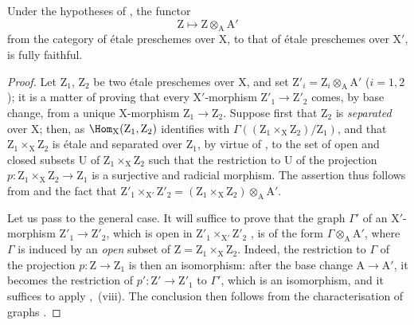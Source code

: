 \begin{corollary}[18.9.5]
\label{IV.18.9.5}
Under the hypotheses of , the functor
\begin{equation}
  \mathrm{Z}\mapsto\mathrm{Z}\otimes_{\mathrm{A}}\mathrm{A}'
  \tag{18.9.5.1}
\end{equation}
from the category of \'{e}tale preschemes over $\mathrm{X}$, to that of \'{e}tale preschemes over $\mathrm{X}'$, is fully faithful.
\end{corollary}

\begin{proof}
Let $\mathrm{Z}_1$, $\mathrm{Z}_2$ be two \'{e}tale preschemes over X, and set $\mathrm{Z}'_i=\mathrm{Z}_i\otimes_{\mathrm{A}}\mathrm{A}'$ ($i=1,2$);
it is a matter of proving that every $\mathrm{X}'$-morphism $\mathrm{Z}'_1\to\mathrm{Z}'_2$ comes, by base change, from a unique X-morphism $\mathrm{Z}_1\to\mathrm{Z}_2$.
Suppose first that $\mathrm{Z}_2$ is \emph{separated} over X;
then, as $\Hom_{\mathrm{X}}(\mathrm{Z}_1,\mathrm{Z}_2)$ identifies with $\Gamma((\mathrm{Z}_1\times_{\mathrm{X}}\mathrm{Z}_2)/\mathrm{Z}_1)$, and that $\mathrm{Z}_1\times_{\mathrm{X}}\mathrm{Z}_2$ is \'{e}tale and separated over $\mathrm{Z}_1$, by virtue of , to the set of open and closed subsets U of $\mathrm{Z}_1\times_{\mathrm{X}}\mathrm{Z}_2$ such that the restriction to U of the projection $p:\mathrm{Z}_1\times_{\mathrm{X}}\mathrm{Z}_2\to\mathrm{Z}_1$ is a surjective and radicial morphism.
The assertion thus follows from  and the fact that $\mathrm{Z}'_1\times_{\mathrm{X}'}\mathrm{Z}'_2=(\mathrm{Z}_1\times_{\mathrm{X}}\mathrm{Z}_2)\otimes_{\mathrm{A}}\mathrm{A}'$.

Let us pass to the general case.
It will suffice to prove that the graph $\Gamma'$ of an $\mathrm{X}'$-morphism $\mathrm{Z}'_1\to\mathrm{Z}'_2$, which is open in $\mathrm{Z}'_1\times_{\mathrm{X}'}\mathrm{Z}'_2$ , is of the form $\Gamma\otimes_{\mathrm{A}}\mathrm{A}'$, where $\Gamma$ is induced by an \emph{open} subset of $\mathrm{Z}=\mathrm{Z}_1\times_{\mathrm{X}}\mathrm{Z}_2$.
Indeed, the restriction to $\Gamma$ of the projection $p:\mathrm{Z}\to\mathrm{Z}_1$ is then an isomorphism: after the base change $\mathrm{A}\to\mathrm{A}'$, it becomes the restriction of $p':\mathrm{Z}'\to\mathrm{Z}'_1$ to $\Gamma'$, which is an isomorphism, and it suffices to apply ,~(viii).
The conclusion then follows from the characterisation of graphs .


\end{proof}
